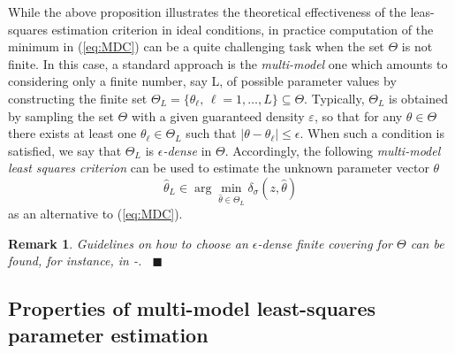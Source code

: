 \documentclass[letterpaper, 10 pt, conference]{ieeetran}
\def\qedp{\hspace*{\fill}~{\tiny $\blacksquare$}}
\newtheorem{itremark}{Remark}
\newenvironment{remark}{\begin{itremark}\rm}{\end{itremark}}
\begin{document}
While the above proposition illustrates the theoretical effectiveness of the leas-squares estimation criterion in ideal conditions, in practice computation of the minimum
in (\ref{eq:MDC}) can be a quite challenging task when the set $\Theta$ is not finite. In this case, a standard approach is the {\em multi-model} one which amounts to considering only a finite
number, say L, of possible parameter values by constructing the finite set 
$\Theta_L =\{   \theta_\ell, \, \ell = 1, \ldots, L  \} \subseteq \Theta$. 
Typically, $\Theta_L$ is obtained by sampling the set $\Theta$ with a given guaranteed density $\varepsilon$, so that for any $\theta \in \Theta$ there exists
at least one $\theta_\ell \in \Theta_L$ such that $| \theta - \theta_\ell | \le \epsilon$. When such a condition is satisfied, we say that $\Theta_L$ is {\em $\epsilon$-dense} in $\Theta$.
Accordingly, the following {\em multi-model least squares criterion}  can be used to estimate the unknown parameter vector $\theta$
\begin{equation}\label{eq:MDC:MM}
\hat \theta_L  \in \arg \min_{\hat \theta \in \Theta_L}{\delta_\sigma(z,\hat \theta)}
\end{equation}
as an alternative to (\ref{eq:MDC}). 

\begin{remark}
Guidelines on how to choose an {\em $\epsilon$-dense} finite covering for $\Theta$
can be found, for instance, in \cite{debruye2}-\nocite{baldi2}\cite{Buchstaller}. \qedp
\end{remark}

\subsection{Properties of multi-model least-squares parameter estimation}
\end{document}
